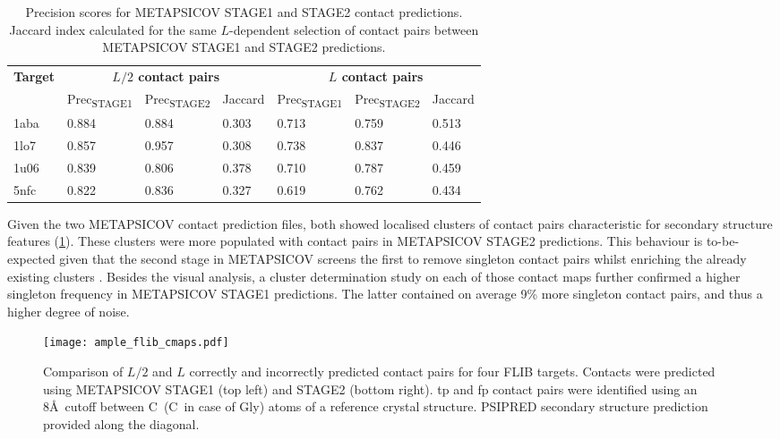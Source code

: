 \begin{table}[H]
  \centering
  \caption[Contact prediction summary for FLIB targets]{Precision scores for METAPSICOV \cite{Jones2015-vq} STAGE1 and STAGE2 contact predictions. Jaccard index calculated for the same $L$-dependent selection of contact pairs between METAPSICOV STAGE1 and STAGE2 predictions.}
  \label{table:ample_flib_contact_precision}
  \begin{tabularx}{\textwidth}{X X X X X X X}
      \hline
	  \multirow{2}{*}{\textbf{Target}} & \multicolumn{3}{c}{\textbf{$L/2$ contact pairs}} & \multicolumn{3}{c}{\textbf{$L$ contact pairs}} 	\\ \cline{2-7}
	  							&  	Prec\textsubscript{STAGE1}	& 	Prec\textsubscript{STAGE2}	& 	Jaccard 	& 	Prec\textsubscript{STAGE1} 	& 	Prec\textsubscript{STAGE2} 	& 	Jaccard	\\
	  \hline
	  1aba						&	0.884	&	0.884	&	0.303	&	0.713	&	0.759	&	0.513		\\
	  1lo7						&	0.857	&	0.957	&	0.308	&	0.738	&	0.837	&	0.446		\\
	  1u06						&	0.839	&	0.806	&	0.378	&	0.710	&	0.787	&	0.459		\\
	  5nfc						&	0.822	&	0.836	&	0.327	&	0.619	&	0.762	&	0.434		\\ 
	  \hline
  \end{tabularx}
\end{table}

Given the two METAPSICOV contact prediction files, both showed localised clusters of contact pairs characteristic for secondary structure features (\cref{fig:ample_flib_cmaps}). These clusters were more populated with contact pairs in METAPSICOV STAGE2 predictions. This behaviour is to-be-expected given that the second stage in METAPSICOV screens the first to remove singleton contact pairs whilst enriching the already existing clusters \cite{Jones2015-vq}. Besides the visual analysis, a cluster determination study on each of those contact maps further confirmed a higher singleton frequency in METAPSICOV STAGE1 predictions. The latter contained on average 9\% more singleton contact pairs, and thus a higher degree of noise.

\begin{figure}[H]
	\centering
	\texttt{[image: ample\_flib\_cmaps.pdf]}
        \caption[Contact map comparison for FLIB targets]{Comparison of $L/2$ and $L$ correctly and incorrectly predicted contact pairs for four FLIB targets. Contacts were predicted using METAPSICOV \cite{Jones2015-vq} STAGE1 (top left) and STAGE2 (bottom right). \Gls{tp} and \gls{fp} contact pairs were identified using an 8\AA\ cutoff between C\textalpha\ (C\textbeta\ in case of Gly) atoms of a reference crystal structure. PSIPRED \cite{Jones1999-ed} secondary structure prediction provided along the diagonal.}
	\label{fig:ample_flib_cmaps}
\end{figure}


